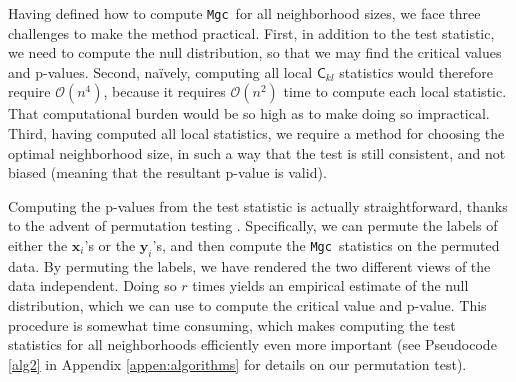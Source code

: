 \documentclass[11pt]{article}
\newcommand{\note}[2][]{\added[#1,remark={#2}]{}}
\providecommand{\sct}[1]{{\sc \texttt{#1}}}
\providecommand{\mb}[1]{\boldsymbol{#1}}
\providecommand{\mc}[1]{\mathcal{#1}}
\newcommand{\G}{\mathsf{C}}
\newcommand{\Mgc}{\sct{Mgc}}
\newcommand{\cs}[1]{{\note{cs: #1}}}
\newcommand{\mbx}{\ensuremath{\mb{x}}}
\newcommand{\mby}{\ensuremath{\mb{y}}}
\begin{document}
\cs{removed: providing all local p-values and selecting the optimal neighborhood size.}
\cs{this seems to be a technical detail.  maybe we can put it back in the appendix where we define things more rigorously? ``''Clearly the optimal scale exists, is distribution dependent, and may not be unique. ''}
% 

Having defined how to compute \Mgc~for all neighborhood sizes, we face three challenges to make the method practical. First, in addition to the test statistic, we need to compute the null distribution, so that we may find the critical values and p-values.
Second, na\"ively, computing all local $\G_{kl}$ statistics would therefore require $\mc{O}(n^4)$, because it requires $\mc{O}(n^2)$ time to compute each local statistic.  That computational burden would be so high as to make doing so impractical.  Third, having computed all local statistics, we require a method for choosing the optimal neighborhood size, in such a way that the test is still consistent, and not biased (meaning that the resultant p-value is valid).   

Computing the p-values from the test statistic is actually straightforward, thanks to the advent of permutation testing \cite{Good2005}.  Specifically, we can permute the labels of either the $\mbx_i$'s or the $\mby_i$'s, and then compute the \Mgc~statistics on the permuted data.  By permuting the labels, we have rendered the two different views of the data independent.  Doing so $r$ times yields an empirical estimate of the null distribution, which we can use to compute the critical value and p-value. This procedure is somewhat time consuming, which makes computing the test statistics for all neighborhoods efficiently even more important (see Pseudocode \ref{alg2} in Appendix \ref{appen:algorithms} for details on our permutation test).
\end{document}
